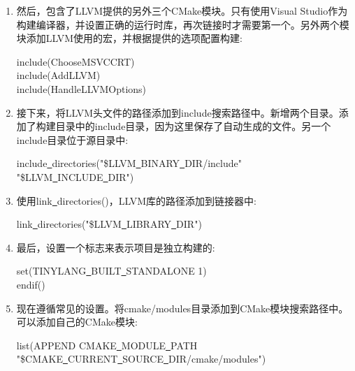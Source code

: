 \begin{enumerate}
\item 然后，包含了LLVM提供的另外三个CMake模块。只有使用Visual Studio作为构建编译器，并设置正确的运行时库，再次链接时才需要第一个。另外两个模块添加LLVM使用的宏，并根据提供的选项配置构建:
\begin{tcolorbox}[colback=white,colframe=black]
\hspace*{0.5cm}include(ChooseMSVCCRT) \\
\hspace*{0.5cm}include(AddLLVM) \\
\hspace*{0.5cm}include(HandleLLVMOptions)
\end{tcolorbox}

\item 接下来，将LLVM头文件的路径添加到include搜索路径中。新增两个目录。添加了构建目录中的include目录，因为这里保存了自动生成的文件。另一个include目录位于源目录中:
\begin{tcolorbox}[colback=white,colframe=black]
\hspace*{0.5cm}include\underline{~}directories("\${LLVM\underline{~}BINARY\underline{~}DIR}/include" \\
\hspace*{1cm}"\${LLVM\underline{~}INCLUDE\underline{~}DIR}")
\end{tcolorbox}
 
\item 使用link\underline{~}directories()，LLVM库的路径添加到链接器中:
\begin{tcolorbox}[colback=white,colframe=black]
\hspace*{0.5cm}link\underline{~}directories("\${LLVM\underline{~}LIBRARY\underline{~}DIR}")
\end{tcolorbox}
 
\item 最后，设置一个标志来表示项目是独立构建的:
\begin{tcolorbox}[colback=white,colframe=black]
\hspace*{0.5cm}set(TINYLANG\underline{~}BUILT\underline{~}STANDALONE 1) \\
endif()
\end{tcolorbox}

\item 现在遵循常见的设置。将cmake/modules目录添加到CMake模块搜索路径中。可以添加自己的CMake模块:
\begin{tcolorbox}[colback=white,colframe=black]
list(APPEND CMAKE\underline{~}MODULE\underline{~}PATH \\
\hspace*{0.5cm}"\${CMAKE\underline{~}CURRENT\underline{~}SOURCE\underline{~}DIR}/cmake/modules")
\end{tcolorbox}
 

\end{enumerate}
